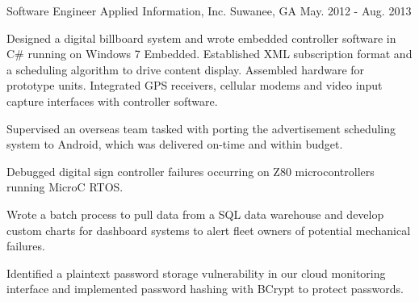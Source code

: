 \begin{cventries}
  \cventry
    {Software Engineer} %
    {Applied Information, Inc.} %
    {Suwanee, GA} %
    {May. 2012 - Aug. 2013} %
    {
      \begin{cvitems} %
        \item {Designed a digital billboard system and wrote embedded controller software in C\# running on Windows 7 Embedded. Established XML subscription format and a scheduling algorithm to drive content display. Assembled hardware for prototype units. Integrated GPS receivers, cellular modems and video input capture interfaces with controller software.}
        \item {Supervised an overseas team tasked with porting the advertisement scheduling system to Android, which was delivered on-time and within budget.}
        \item {Debugged digital sign controller failures occurring on Z80 microcontrollers running MicroC RTOS.}
        \item {Wrote a batch process to pull data from a SQL data warehouse and develop custom charts for dashboard systems to alert fleet owners of potential mechanical failures.}
        \item {Identified a plaintext password storage vulnerability in our cloud monitoring interface and implemented password hashing with BCrypt to protect passwords.}
      \end{cvitems}
    }

\end{cventries}
